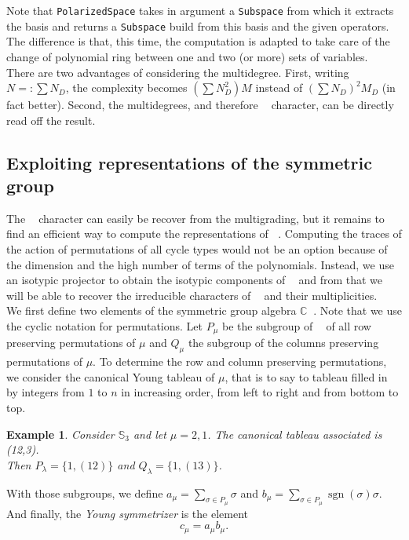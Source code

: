 \documentclass[letter,12pt]{article}
\newcommand{\CC}{\mathbb{C}}
\newcommand{\Sym}[1]{\mathbb{S}_{#1}}
\DeclareMathOperator{\Sn}{\mathbb{S}_n}
\DeclareMathOperator{\GLr}{GL_r}
\DeclareMathOperator{\sgn}{sgn}
\newtheorem{example}{Example}
\newcommand{\tableau}{\YFrench \Yboxdim{10pt}\young}
\begin{document}
	Note that \texttt{PolarizedSpace} takes in argument a \texttt{Subspace} from which it extracts the basis and returns a \texttt{Subspace} build from this basis and the given operators. The difference is that, this time, the computation is adapted to take care of the change of polynomial ring between one and two (or more) sets of variables. \\
	
	There are two advantages of considering the multidegree. 
	First, writing $N=:\sum N_D$, the complexity becomes $(\sum N_D^2) M$ instead of $(\sum N_D)^2M_D$ (in fact better).
	Second, the multidegrees, and therefore $\GLr$ character, can be directly read off the result.
	
	\subsection{Exploiting representations of the symmetric group}
	
	The $\GLr$ character can easily be recover from the multigrading, but it remains to find an efficient way to compute the representations of $\Sn$. Computing the traces of the action of permutations of all cycle types would not be an option because of the dimension and the high number of terms of the polynomials. 
	Instead, we use an isotypic projector to obtain the isotypic components of $\Sn$ and from that we will be able to recover the irreducible characters of $\Sn$ and their multiplicities. \\
	
	We first define two elements of the symmetric group algebra $\CC \Sn$. Note that we use the cyclic notation for permutations.
	Let $P_{\mu}$ be the subgroup of $\Sn$ of all row preserving permutations of $\mu$ and $Q_{\mu}$ the subgroup of the columns preserving permutations of $\mu$. To determine the row and column preserving permutations, we consider the canonical Young tableau of $\mu$, that is to say to tableau filled in by integers from $1$ to $n$ in increasing order, from left to right and from bottom to top. 
	\begin{example} Consider $\Sym{3}$ and let $\mu = 2,1$.
		The canonical tableau associated is \tableau(12,3).\\
		Then $P_\lambda = \{1, (12)\}$ and $Q_\lambda = \{1, (13)\}$. \\
	\end{example}
	
	With those subgroups, we define $a_{\mu} = \sum_{\sigma \in P_{\mu}} \sigma$ and  $b_{\mu} = \sum_{\sigma \in P_{\mu}} \sgn(\sigma) \sigma$. And finally, the \emph{Young symmetrizer} is the element $$c_{\mu} = a_{\mu} b_{\mu}.$$
	
\end{document}
